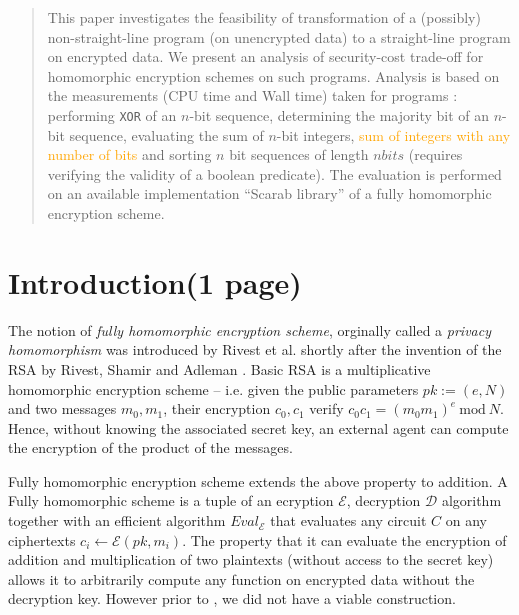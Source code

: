 \documentclass{acm_proc_article-sp}
\begin{document}
\date{30 July 1999}
\maketitle
\begin{abstract}
This paper investigates the feasibility of transformation of a (possibly) non-straight-line program (on unencrypted data) to a straight-line program on encrypted data. We present an analysis of security-cost trade-off for homomorphic encryption schemes on such programs. Analysis is based on the measurements (CPU time and  Wall time) taken for programs : performing \texttt{XOR} of an $n$-bit sequence, determining the majority bit of an $n$-bit sequence, evaluating the sum of $n$-bit integers, \textcolor{orange}{sum of integers with any number of bits} and sorting $n$ bit sequences of length $nbits$ (requires verifying the validity of a boolean predicate). The evaluation is performed on an available implementation ``Scarab library'' of a fully homomorphic encryption scheme. 

\end{abstract}


\section{Introduction(1 page)}

The notion of \textit{fully homomorphic encryption scheme}, orginally called a \textit{privacy homomorphism} was introduced by Rivest et al. \cite{rivest78} shortly after the invention of the RSA by Rivest, Shamir and Adleman \cite{Rivest78amethod}.  Basic RSA is a multiplicative homomorphic encryption scheme -- i.e. given the public parameters $pk:=(e, N)$ and two messages $m_0, m_1$, their encryption $c_0, c_1$ verify $c_0c_1=(m_0m_1)^e \ \textrm {mod}\ N$. Hence, without knowing the associated secret key, an external agent can compute the encryption of the product of the messages.

Fully homomorphic encryption scheme extends the above property to addition. A Fully homomorphic scheme is a tuple of an ecryption $\mathcal{E}$, decryption $\mathcal{D}$ algorithm together with an efficient algorithm $Eval_\mathcal{E}$ that evaluates any circuit $C$ on any ciphertexts $c_i \leftarrow \mathcal{E}(pk, m_i)$. The property that it can evaluate the encryption of addition and multiplication of two plaintexts (without access to the secret key) allows it to arbitrarily compute any function on encrypted data without the decryption key. However prior to \cite{homenc}, we did not have a viable construction.
\end{document}

